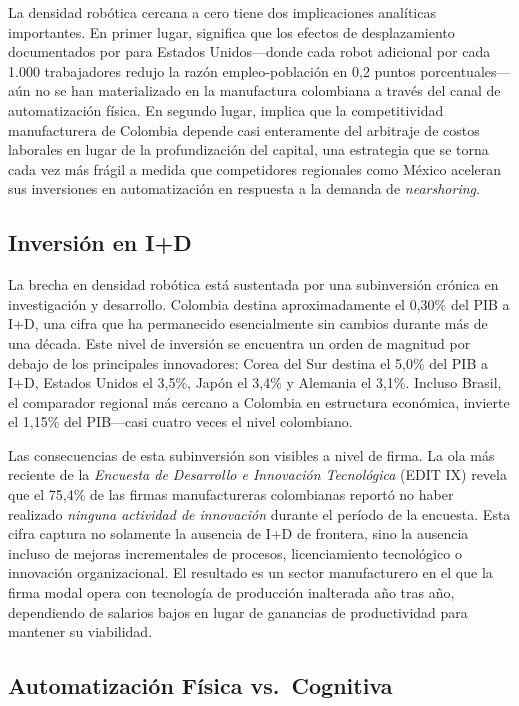 \documentclass{article}
\begin{document}
La densidad rob\'otica cercana a cero tiene dos implicaciones anal\'iticas importantes. En primer lugar, significa que los efectos de desplazamiento documentados por \cite{acemoglu2020robots} para Estados Unidos---donde cada robot adicional por cada 1.000 trabajadores redujo la raz\'on empleo-poblaci\'on en 0,2 puntos porcentuales---a\'un no se han materializado en la manufactura colombiana a trav\'es del canal de automatizaci\'on f\'isica. En segundo lugar, implica que la competitividad manufacturera de Colombia depende casi enteramente del arbitraje de costos laborales en lugar de la profundizaci\'on del capital, una estrategia que se torna cada vez m\'as fr\'agil a medida que competidores regionales como M\'exico aceleran sus inversiones en automatizaci\'on en respuesta a la demanda de \textit{nearshoring}.

\subsection{Inversi\'on en I+D}
\label{subsec:rd_investment}

La brecha en densidad rob\'otica est\'a sustentada por una subinversi\'on cr\'onica en investigaci\'on y desarrollo. Colombia destina aproximadamente el 0,30\% del PIB a I+D, una cifra que ha permanecido esencialmente sin cambios durante m\'as de una d\'ecada. Este nivel de inversi\'on se encuentra un orden de magnitud por debajo de los principales innovadores: Corea del Sur destina el 5,0\% del PIB a I+D, Estados Unidos el 3,5\%, Jap\'on el 3,4\% y Alemania el 3,1\%. Incluso Brasil, el comparador regional m\'as cercano a Colombia en estructura econ\'omica, invierte el 1,15\% del PIB---casi cuatro veces el nivel colombiano.

Las consecuencias de esta subinversi\'on son visibles a nivel de firma. La ola m\'as reciente de la \textit{Encuesta de Desarrollo e Innovaci\'on Tecnol\'ogica} (EDIT IX) revela que el 75,4\% de las firmas manufactureras colombianas report\'o no haber realizado \textit{ninguna actividad de innovaci\'on} durante el per\'iodo de la encuesta. Esta cifra captura no solamente la ausencia de I+D de frontera, sino la ausencia incluso de mejoras incrementales de procesos, licenciamiento tecnol\'ogico o innovaci\'on organizacional. El resultado es un sector manufacturero en el que la firma modal opera con tecnolog\'ia de producci\'on inalterada a\~no tras a\~no, dependiendo de salarios bajos en lugar de ganancias de productividad para mantener su viabilidad.

\subsection{Automatizaci\'on F\'isica vs.\ Cognitiva}
\label{subsec:physical_cognitive}
\end{document}

